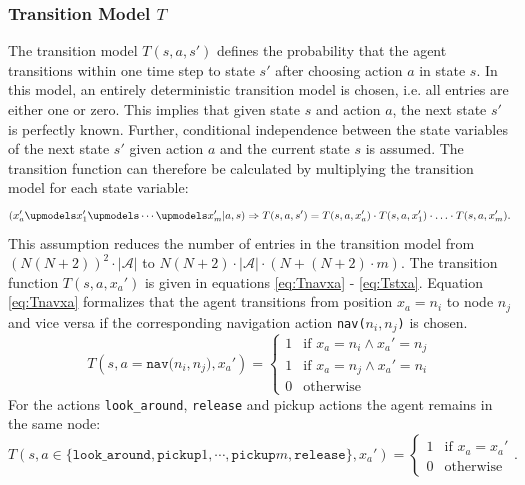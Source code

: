 \subsubsection{Transition Model $T$}
The transition model $T(s, a, s')$ defines the probability that the agent transitions within one time step to state $s'$ after choosing action $a$ in state $s$. In this model, an entirely deterministic transition model is chosen, i.e. all entries are either one or zero. This implies that given state $s$ and action $a$, the next state $s'$ is perfectly known. Further, conditional independence between the state variables of the next state $s'$ given action $a$ and the current state $s$ is assumed. The transition function can therefore be calculated by multiplying the transition model for each state variable:
\begin{equation}
    \left(x_a' \upmodels x_1' \upmodels \cdots \upmodels x_m' |a, s\right) \Rightarrow T(s,a,s') = T(s,a, x_a') \cdot T(s,a,x_1') \cdot \ldots \cdot T(s,a,x_m').
\end{equation}
This assumption reduces the number of entries in the transition model from \\$\left(N(N+2)\right)^2\cdot|\mathcal{A}|$ to $N(N+2)\cdot|\mathcal{A}|\cdot (N+(N+2)\cdot m)$. The transition function $T(s, a, x_a')$ is given in equations \ref{eq:Tnavxa} - \ref{eq:Tstxa}. Equation \ref{eq:Tnavxa} formalizes that the agent transitions from position $x_a=n_i$ to node $n_j$ and vice versa if the corresponding navigation action \texttt{nav($n_i,n_j$)} is chosen.
\begin{equation}\label{eq:Tnavxa}
    T(s, a=\texttt{nav($n_i, n_j$)}, x_a') = \begin{cases}
             1 & \text{if }x_a=n_i \land x_a'=n_j\\
             1 & \text{if }x_a=n_j \land x_a'=n_i\\
             0 & \text{otherwise}
         \end{cases}
\end{equation}
For the actions \texttt{look\_around}, \texttt{release} and pickup actions the agent remains in the same node: 
\begin{equation}
    T(s,a\in\{\texttt{look\_around}, \texttt{pickup}1,\cdots,\texttt{pickup}m, \texttt{release}\}, x_a') = 
    \begin{cases}
        1 & \text{if }x_a=x_a' \\
        0 & \text{otherwise}
    \end{cases}.
\end{equation}
